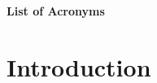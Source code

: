 \documentclass[11pt]{report}
\begin{document}
%
%



%
%



%
%

\tableofcontents

%
%

\newpage
\Large{\textbf{List of Acronyms}}
\small


%
%

\chapter{Introduction}
\label{intro}


%
%


% 
% 

% 
% 
% 

%
%



%
%

% 
% 

%
%

% 
% 
% 
% 
% 
\end{document}
